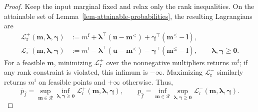 \documentclass[review,11pt,3p,authoryear,nopreprintline]{elsarticle}
\begin{document}
\begin{proof}
  Keep the input marginal fixed and relax only the rank inequalities. On the attainable set of Lemma~\ref{lem-attainable-probabilities}, the resulting Lagrangians are
  \begin{equation}
    \begin{aligned}
      \mathcal L_{\mathrm r}^+(\bm m,\bm\lambda,\bm\gamma)
      &:=m^{\mathrm f}+\bm\lambda^\top\left(\bm u-\bm m^{<}\right)
        +\bm\gamma^\top\left(\bm m^{\le}-\bm l\right),\\
      \mathcal L_{\mathrm r}^-(\bm m,\bm\lambda,\bm\gamma)
      &:=m^{\mathrm f}-\bm\lambda^\top\left(\bm u-\bm m^{<}\right)
        -\bm\gamma^\top\left(\bm m^{\le}-\bm l\right),
        \qquad\bm\lambda,\bm\gamma\ge\bm0.
    \end{aligned}
    \label{eq-rank-probability-lagrangians}
  \end{equation}
  For a feasible $\bm m$, minimizing $\mathcal L_{\mathrm r}^+$ over the nonnegative multipliers returns $m^{\mathrm f}$; if any rank constraint is violated, this infimum is $-\infty$. Maximizing $\mathcal L_{\mathrm r}^-$ similarly returns $m^{\mathrm f}$ on feasible points and $+\infty$ otherwise. Thus,
  \begin{equation}
    \overline p_{\hat f}=\sup_{\bm m\in\mathcal R}
      \inf_{\bm\lambda,\bm\gamma\ge\bm0}\mathcal L_{\mathrm r}^+(\bm m,\bm\lambda,\bm\gamma),
    \qquad
    \underline p_{\hat f}=\inf_{\bm m\in\mathcal R}
      \sup_{\bm\lambda,\bm\gamma\ge\bm0}\mathcal L_{\mathrm r}^-(\bm m,\bm\lambda,\bm\gamma).
    \label{eq-primal-minimax-representation}
  \end{equation}


\end{proof}
\end{document}
